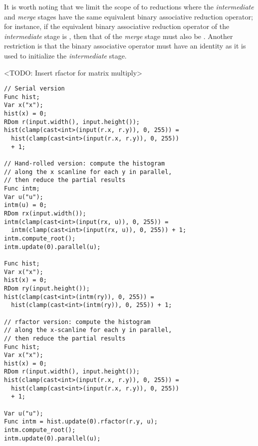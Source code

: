 It is worth noting that we limit the scope of  to reductions where the \emph{intermediate} and \emph{merge} stages have the same equivalent binary associative reduction operator; for instance, if the equivalent binary associative reduction operator of the \emph{intermediate} stage is , then that of the \emph{merge} stage must also be . Another restriction is that the binary associative operator must have an identity as it is used to initialize the \emph{intermediate} stage.

<TODO: Insert rfactor for matrix multiply> \\

\begin{lstlisting}[caption={Histogram of a two-dimensional image: serial vs. parallel hand-rolled vs. parallel rfactor}, label={lst:histogram_rfactor}]
// Serial version
Func hist;
Var x("x");
hist(x) = 0;
RDom r(input.width(), input.height());
hist(clamp(cast<int>(input(r.x, r.y)), 0, 255)) =
  hist(clamp(cast<int>(input(r.x, r.y)), 0, 255))
  + 1;

// Hand-rolled version: compute the histogram 
// along the x scanline for each y in parallel, 
// then reduce the partial results
Func intm;
Var u("u");
intm(u) = 0;
RDom rx(input.width());
intm(clamp(cast<int>(input(rx, u)), 0, 255)) =
  intm(clamp(cast<int>(input(rx, u)), 0, 255)) + 1;
intm.compute_root();
intm.update(0).parallel(u);

Func hist;
Var x("x");
hist(x) = 0;
RDom ry(input.height());
hist(clamp(cast<int>(intm(ry)), 0, 255)) =
  hist(clamp(cast<int>(intm(ry)), 0, 255)) + 1;

// rfactor version: compute the histogram 
// along the x-scanline for each y in parallel, 
// then reduce the partial results
Func hist;
Var x("x");
hist(x) = 0;
RDom r(input.width(), input.height());
hist(clamp(cast<int>(input(r.x, r.y)), 0, 255)) =
  hist(clamp(cast<int>(input(r.x, r.y)), 0, 255)) 
  + 1;

Var u("u");
Func intm = hist.update(0).rfactor(r.y, u);
intm.compute_root();
intm.update(0).parallel(u);
\end{lstlisting}

